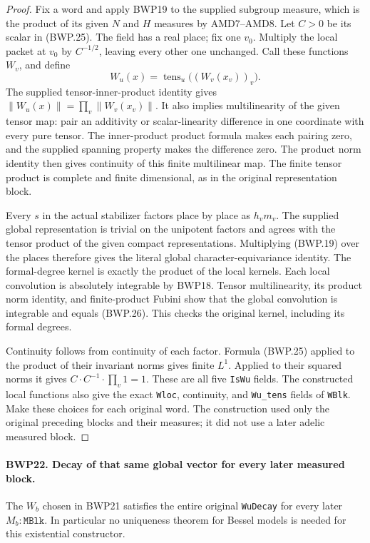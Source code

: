 \begin{proof}
Fix a word and apply BWP19 to the supplied subgroup measure,
which is the product of its given \(N\) and \(H\) measures by
AMD7--AMD8.  Let \(C>0\) be its scalar in (BWP.25).  The field
has a real place; fix one \(v_0\).  Multiply the local packet at
\(v_0\) by \(C^{-1/2}\), leaving every other one unchanged.
Call these functions \(W_v\), and define
\[
 W_u(x)=\operatorname{tens}_u\bigl((W_v(x_v))_v\bigr).
 \tag{BWP.26}
\]
The supplied tensor-inner-product identity gives
\(\|W_u(x)\|=\prod_v\|W_v(x_v)\|\).
It also implies multilinearity of the given tensor map: pair an
additivity or scalar-linearity difference in one coordinate with
every pure tensor.  The inner-product product formula makes each
pairing zero, and the supplied spanning property makes the difference
zero.  The product norm identity then gives continuity of this
finite multilinear map.
The finite tensor product is complete and finite dimensional,
as in the original representation block.

Every \(s\) in the actual stabilizer factors place by place as
\(h_vm_v\).  The supplied global representation is trivial on
the unipotent factors and agrees with the tensor product of the given
compact representations.  Multiplying (BWP.19) over the places
therefore gives the literal global character-equivariance identity.
The formal-degree kernel is exactly the product of the local kernels.
Each local convolution is absolutely integrable by BWP18.  Tensor
multilinearity, its product norm identity, and finite-product Fubini
show that the global convolution is integrable and equals (BWP.26).
This checks the original kernel, including its formal degrees.

Continuity follows from continuity of each factor.  Formula (BWP.25)
applied to the product of their invariant norms gives finite \(L^1\).
Applied to their squared norms it gives
\(C\cdot C^{-1}\cdot\prod_v1=1\).
These are all five \texttt{IsWu} fields.  The constructed local
functions also give the exact \texttt{Wloc}, continuity, and
\texttt{Wu\_tens} fields of \texttt{WBlk}.
Make these choices for each original word.  The construction used
only the original preceding blocks and their measures; it did not
use a later adelic measured block.
\end{proof}

\paragraph{BWP22. Decay of that same global vector for every later measured block.}
\label{claim:BWP22}
The \(W_b\) chosen in BWP21 satisfies the entire original
\texttt{WuDecay} for every later \(M_b:\texttt{MBlk}\).
In particular no uniqueness theorem for Bessel models is needed
for this existential constructor.

